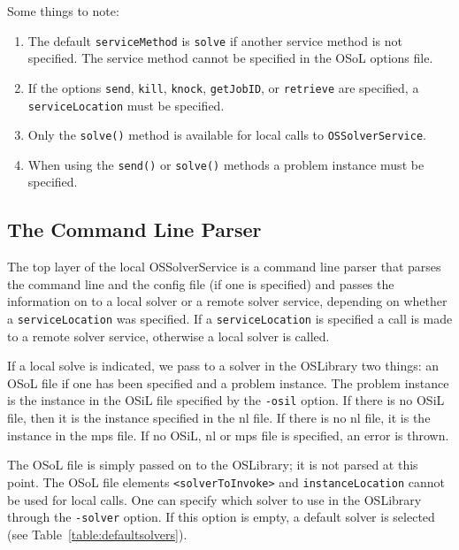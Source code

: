 \documentclass[11pt]{article}
\renewcommand{\_}{{\char"5F}}
\renewcommand{\{}{{\char"7B}}
\renewcommand{\}}{{\char"7D}}
\renewcommand{\^}{{\char"0D}}
\renewcommand{\'}{{\char"0D}}
\begin{document}
\begin{enumerate}[Step 1:]
Some things to note:

\begin{enumerate}
\item{}  The default {\tt serviceMethod} is {\tt solve} if another service method is not specified.
The service method cannot be specified in the OSoL options file.

\item{}  If the options {\tt send}, {\tt kill},
{\tt knock},  {\tt getJobID},
or {\tt retrieve} are specified,
a  {\tt serviceLocation} must be specified.

\item{}  Only the {\tt solve()} method is available for local calls
to {\tt OSSolverService}.

\item{}  When using the {\tt send()} or  {\tt solve()} methods
a problem instance must be specified.

\end{enumerate}


\subsection{The Command Line Parser}\label{section:commandlineparser}

The top layer of the local OSSolverService is a command line parser that parses the command line and
the config file (if one is specified) and passes the information on to a local solver or a remote solver service,
depending on whether a {\tt serviceLocation} was specified. If a 
{\tt serviceLocation} is specified a call is made to a remote solver service, otherwise a local solver is called.

\medskip

If a local solve is indicated, we pass to a solver in the OSLibrary two things: 
an OSoL file if one has been specified and a problem instance. The problem instance 
is the instance in the OSiL file specified by the {\tt -osil} option. If there is no OSiL file, 
then it is the instance specified in the nl file. If there is no nl file, it is the 
instance in the mps file. If no OSiL, nl or mps file is specified, an error is thrown. 

The OSoL file is simply passed on to the OSLibrary; it is not parsed at this point. 
The OSoL file elements {\tt <solverToInvoke>} and {\tt instanceLocation} cannot be used for local calls.
One can specify which solver to use in the OSLibrary through the {\tt -solver} option. If this 
option is empty, a default solver is selected (see Table~\ref{table:defaultsolvers}).


\end{enumerate}
\end{document}

